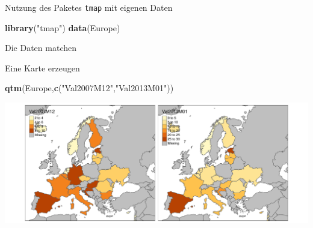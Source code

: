 \documentclass[ignorenonframetext,]{beamer}
\newenvironment{Shaded}{\begin{snugshade}}{\end{snugshade}}
\newcommand{\KeywordTok}[1]{\textcolor[rgb]{0.13,0.29,0.53}{\textbf{#1}}}
\newcommand{\DecValTok}[1]{\textcolor[rgb]{0.00,0.00,0.81}{#1}}
\newcommand{\StringTok}[1]{\textcolor[rgb]{0.31,0.60,0.02}{#1}}
\newcommand{\OperatorTok}[1]{\textcolor[rgb]{0.81,0.36,0.00}{\textbf{#1}}}
\newcommand{\NormalTok}[1]{#1}
\begin{document}
\begin{frame}[fragile]{Nutzung des Paketes \texttt{tmap} mit eigenen
Daten}

\begin{Shaded}
\begin{Highlighting}[]
\KeywordTok{library}\NormalTok{(}\StringTok{"tmap"}\NormalTok{)}
\KeywordTok{data}\NormalTok{(Europe)}
\end{Highlighting}
\end{Shaded}

\begin{block}{Die Daten matchen}

\begin{Shaded}
\end{Shaded}

\end{block}

\end{frame}

\begin{frame}[fragile]{Eine Karte erzeugen}

\begin{Shaded}
\begin{Highlighting}[]
\KeywordTok{qtm}\NormalTok{(Europe,}\KeywordTok{c}\NormalTok{(}\StringTok{"Val2007M12"}\NormalTok{,}\StringTok{"Val2013M01"}\NormalTok{))}
\end{Highlighting}
\end{Shaded}

\includegraphics{tmap_files/figure-beamer/unnamed-chunk-49-1.pdf}

\end{frame}
\end{document}
